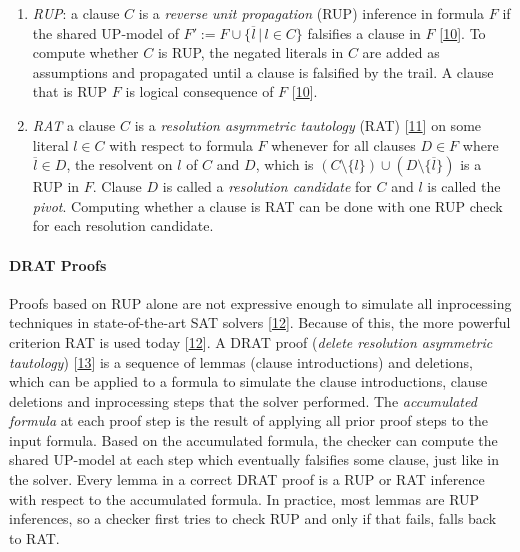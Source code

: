 \documentclass[
]{report}
\begin{document}
\begin{enumerate}
\def\labelenumi{\arabic{enumi}.}
\item
  \emph{RUP}: a clause \(C\) is a \emph{reverse unit propagation} (RUP)
  inference in formula \(F\) if the shared UP-model of
  \(F' := F \cup \{ \overline{l} \,|\, l \in C \}\) falsifies a clause
  in \(F\) {[}\protect\hyperlink{ref-rup}{10}{]}. To compute whether
  \(C\) is RUP, the negated literals in \(C\) are added as assumptions
  and propagated until a clause is falsified by the trail. A clause that
  is RUP \(F\) is logical consequence of \(F\)
  {[}\protect\hyperlink{ref-rup}{10}{]}.
\item
  \emph{RAT} a clause \(C\) is a \emph{resolution asymmetric tautology}
  (RAT) {[}\protect\hyperlink{ref-inprocessingrules}{11}{]} on some
  literal \(l \in C\) with respect to formula \(F\) whenever for all
  clauses \(D \in F\) where \(\overline{l} \in D\), the resolvent on
  \(l\) of \(C\) and \(D\), which is
  \((C \setminus \{l\}) \cup (D \setminus \{\overline{l}\})\) is a RUP
  in \(F\). Clause \(D\) is called a \emph{resolution candidate} for
  \(C\) and \(l\) is called the \emph{pivot}. Computing whether a clause
  is RAT can be done with one RUP check for each resolution candidate.
\end{enumerate}

\paragraph{DRAT Proofs}

Proofs based on RUP alone are not expressive enough to simulate all
inprocessing techniques in state-of-the-art SAT solvers
{[}\protect\hyperlink{ref-rat}{12}{]}. Because of this, the more
powerful criterion RAT is used today
{[}\protect\hyperlink{ref-rat}{12}{]}. A DRAT proof (\emph{delete
resolution asymmetric tautology})
{[}\protect\hyperlink{ref-Wetzler_2014}{13}{]} is a sequence of lemmas
(clause introductions) and deletions, which can be applied to a formula
to simulate the clause introductions, clause deletions and inprocessing
steps that the solver performed. The \emph{accumulated formula} at each
proof step is the result of applying all prior proof steps to the input
formula. Based on the accumulated formula, the checker can compute the
shared UP-model at each step which eventually falsifies some clause,
just like in the solver. Every lemma in a correct DRAT proof is a RUP or
RAT inference with respect to the accumulated formula. In practice, most
lemmas are RUP inferences, so a checker first tries to check RUP and
only if that fails, falls back to RAT.
\end{document}
